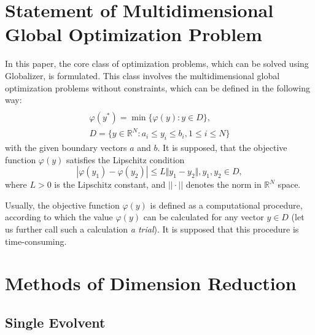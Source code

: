 \documentclass[runningheads]{llncs}
\begin{document}
\section{Statement of Multidimensional Global Optimization Problem}
In this paper, the core class of optimization problems, which can be solved using
Globalizer, is formulated. This class involves the multidimensional global
optimization problems without constraints, which can be defined in the following way:
\begin{equation}
\label{eq:task}
\begin{array}{cr}\\
  \varphi(y^*)=\min\{\varphi(y):y\in D\}, \\
  D=\{y\in \mathbb{R}^N:a_i\leq y_i\leq{b_i}, 1\leq{i}\leq{N}\}
\end{array}
\end{equation}
with the given boundary vectors  $a$ and  $b$. It is supposed, that the objective function
\(\varphi(y)\) satisfies the Lipschitz condition
\begin{equation}
\label{eq:lip}
|\varphi(y_1)-\varphi(y_2)|\leq L\Vert y_1-y_2\Vert,y_1,y_2\in D,
\end{equation}
where \(L>0\) is the Lipschitz constant, and \(||\cdot||\) denotes the norm in \(\mathbb{R}^N\)
space.
\par
Usually, the objective function \(\varphi(y)\) is defined as a computational procedure,
according to which the value \(\varphi(y)\) can be calculated for any vector \(y\in D\)
(let us further call such a calculation \textit{a trial}). It is supposed that this procedure
is time-consuming.

\section{Methods of Dimension Reduction}
\subsection{Single Evolvent}
\end{document}
